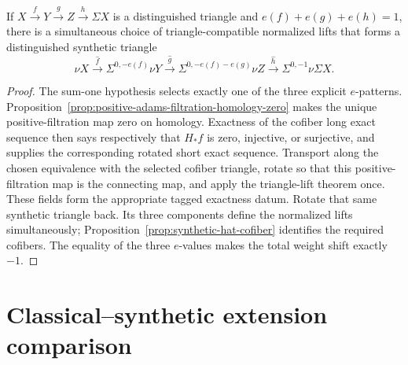 \begin{proposition}
  \label{prop:normalized-synthetic-triangle}
  \notready
  If $X\xrightarrow fY\xrightarrow gZ\xrightarrow h\Sigma X$ is a
  distinguished triangle and $e(f)+e(g)+e(h)=1$, there is a simultaneous
  choice of triangle-compatible normalized lifts that forms a distinguished
  synthetic triangle
  \[
    \nu X\xrightarrow{\widehat f}\Sigma^{0,-e(f)}\nu Y
    \xrightarrow{\widehat g}\Sigma^{0,-e(f)-e(g)}\nu Z
    \xrightarrow{\widehat h}\Sigma^{0,-1}\nu\Sigma X.
  \]
\end{proposition}

\begin{proof}
  The sum-one hypothesis selects exactly one of the three explicit
  $e$-patterns.  Proposition~\ref{prop:positive-adams-filtration-homology-zero}
  makes the unique positive-filtration map zero on homology.  Exactness of the
  cofiber long exact sequence then says respectively that $H_*f$ is zero,
  injective, or surjective, and supplies the corresponding rotated short exact
  sequence.  Transport along the chosen equivalence with the selected cofiber
  triangle, rotate so that this positive-filtration map is the connecting map,
  and apply the triangle-lift theorem once.  These fields form the appropriate
  tagged exactness datum.  Rotate that same synthetic triangle back.  Its three components define the normalized lifts
  simultaneously; Proposition~\ref{prop:synthetic-hat-cofiber} identifies the
  required cofibers.  The equality of the three $e$-values makes the total
  weight shift exactly $-1$.
\end{proof}

\section{Classical--synthetic extension comparison}

